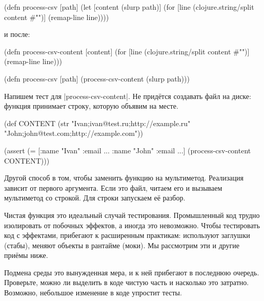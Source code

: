 
\begin{english}
  \begin{clojure}
(defn process-csv [path]
  (let [content (slurp path)]
    (for [line (clojure.string/split content #"\n")]
      (remap-line line))))
  \end{clojure}
\end{english}

\noindent
и после:

\begin{english}
  \begin{clojure}
(defn process-csv-content [content]
  (for [line (clojure.string/split content #"\n")]
    (remap-line line)))

(defn process-csv [path]
  (process-csv-content (slurp path)))
  \end{clojure}
\end{english}

Напишем тест для \spverb|process-csv-content|. Не прид\"{е}тся создавать файл на
диске: функция принимает строку, которую объявим на месте.

\begin{english}
  \begin{clojure}
(def CONTENT
  (str "Ivan;ivan@test.ru;http://example.ru"
       \newline
       "John;john@test.com;http://example.com"))

(assert (= [{:name "Ivan" :email ...}
            {:name "John" :email ...}]
           (process-csv-content CONTENT)))
  \end{clojure}
\end{english}

Другой способ в том, чтобы заменить функцию на мультиметод. Реализация
зависит от первого аргумента. Если это файл, читаем его и вызываем мультиметод
со строкой. Для строки запускаем е\"{е} разбор.

Чистая функция это идеальный случай тестирования. Промышленный код трудно
изолировать от побочных эффектов, а иногда это невозможно. Чтобы тестировать код
с эффектами, прибегают к расширенным практикам: используют заглушки (стабы),
меняют объекты в рантайме (моки). Мы рассмотрим эти и другие при\"{е}мы ниже.

Подмена среды это вынужденная мера, и к ней прибегают в последнюю
очередь. Проверьте, можно ли выделить в коде чистую часть и насколько это
затратно. Возможно, небольшое изменение в коде упростит тесты.

